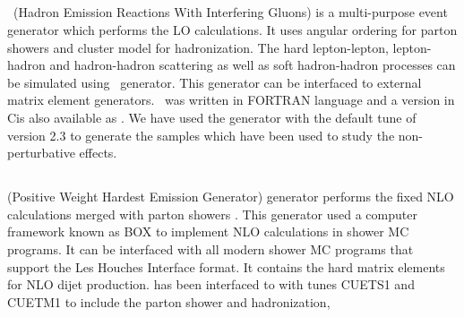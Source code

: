 \subsection{\HERWIG}
\HERWIG~(Hadron Emission Reactions With Interfering Gluons) \cite{Corcella:2000bw} is a multi-purpose event generator which performs the LO calculations. It uses angular ordering for parton showers and cluster model for hadronization. The hard lepton-lepton, lepton-hadron and hadron-hadron scattering as well as soft hadron-hadron processes can be simulated using \HERWIG~generator. This generator can be interfaced to external matrix element generators. \HERWIG~was written in FORTRAN language and a version in C\plusn\plusn is also available as \HERWIGPP \cite{Bahr:2008pv}. We have used the \HERWIGPP generator with the default tune of version 2.3 \cite{Bahr:2008tf} to generate the samples which have been used to study the non-perturbative effects. 

\subsection{\POWHEG}
\POWHEG (Positive Weight Hardest Emission Generator) generator performs the fixed NLO calculations merged with parton showers \cite{Frixione:2007vw, Nason:2004rx, Alioli:2010xa}. This generator used a computer framework known as \POWHEG BOX \cite{Oleari:2010nx} to implement NLO calculations in shower MC programs. It can be interfaced with all modern shower MC programs that support the Les Houches Interface format. It contains the hard matrix elements for NLO dijet production. \POWHEG has been interfaced to \PYTHIAE with tunes CUETS1 and CUETM1 to include the parton shower and hadronization, 
